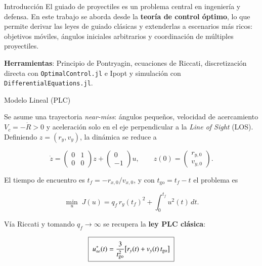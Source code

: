 \begin{block}{Introducción}
	El guiado de proyectiles es un problema central en ingeniería y defensa. 
	En este trabajo se aborda desde la \textbf{teoría de control óptimo}, 
	lo que permite derivar las leyes de guiado clásicas y extenderlas a escenarios
	más ricos: objetivos móviles, ángulos iniciales arbitrarios y coordinación 
	de múltiples proyectiles.

	\vspace{0.2cm}
	\textbf{Herramientas}: Principio de Pontryagin, ecuaciones de Riccati,
	discretización directa con \texttt{OptimalControl.jl} e Ipopt y simulación con \texttt{DifferentialEquations.jl}.

\end{block}

\begin{block}{Modelo Lineal (PLC)}
	\begin{exampleblock}{}
	Se asume una trayectoria \textit{near-miss}: ángulos pequeños, velocidad de 
	acercamiento $V_c=-\dot R>0$ y aceleración solo en el eje perpendicular a la 
	\textit{Line of Sight} (LOS). Definiendo $z=(r_y,v_y)$, la dinámica se reduce a
	
	$$
	\dot z=\begin{pmatrix}0&1\\0&0\end{pmatrix}z
	+\begin{pmatrix}0\\-1\end{pmatrix}u,
	\qquad z(0)=\begin{pmatrix}r_{y,0}\\v_{y,0}\end{pmatrix}.
	$$
	
	El tiempo de encuentro es $t_f=-r_{x,0}/v_{x,0}$, y con 
	$t_{\mathrm{go}}=t_f-t$ el problema es
	
	$$
	\min_{u}\; J(u)=q_f\,r_y(t_f)^2+\int_0^{t_f}u^2(t)\,dt.
	$$
	
	Vía Riccati y tomando $q_f\to\infty$ se recupera la \textbf{ley PLC clásica}:
	
	$$
	\boxed{\;\vphantom{\frac{\frac{A}{B}}{\frac{C}{D}}}
	u_\infty^*(t)=\frac{3}{t_{\mathrm{go}}^2}
	\big[r_y(t)+v_y(t)\,t_{\mathrm{go}}\big]\;}
	$$
	\end{exampleblock}
	{\def\marginimagetop{-2}
	}

	
\end{block}


